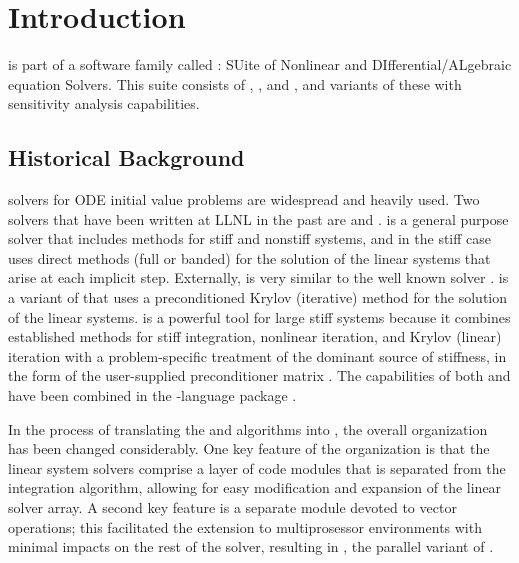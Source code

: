 \section{Introduction}\label{s:intro}

{\cvode} is part of a software family called {\sundials}: 
SUite of Nonlinear and DIfferential/ALgebraic equation Solvers.  
This suite consists of {\cvode}, {\kinsol}, and {\ida}, and variants of these
with sensitivity analysis capabilities.
%
\subsection{Historical Background}\label{ss:history}

{\F} solvers for ODE initial value problems are widespread and heavily used. 
Two solvers that have been written at LLNL in the past are {\vode} \cite{BBH89} 
and {\vodpk} \cite{By92}.
{\vode} is a general purpose solver that includes methods for stiff
and nonstiff systems, and in the stiff case uses direct methods (full or
banded) for the solution of the linear systems that arise at each implicit
step. Externally, {\vode} is very similar to the well known solver
{\lsode} \cite{KH93}.
{\vodpk} is a variant of {\vode} that uses a preconditioned Krylov 
(iterative) method for the solution of the linear systems. {\vodpk} is a powerful 
tool for large stiff systems because it combines established methods for stiff 
integration, nonlinear iteration, and Krylov (linear) iteration with a problem-specific
treatment of the dominant source of stiffness, in the form of the user-supplied
preconditioner matrix \cite{BrHi89}.
The capabilities of both {\vode} and {\vodpk} have been combined in the {\C}-language 
package {\cvode} \cite{CH96}.

In the process of translating the {\vode} and {\vodpk} algorithms into {\C}, the overall 
{\cvode} organization has been changed considerably.
One key feature of the {\cvode} organization is that the linear system solvers comprise a
layer of code modules that is separated from the integration algorithm, allowing for 
easy modification and expansion of the linear solver array.
A second key feature is a separate module devoted to vector operations; this 
facilitated the extension to multiprosessor environments with minimal impacts 
on the rest of the solver, resulting in {\pvode} \cite{ByH99}, 
the parallel variant of {\cvode}.

